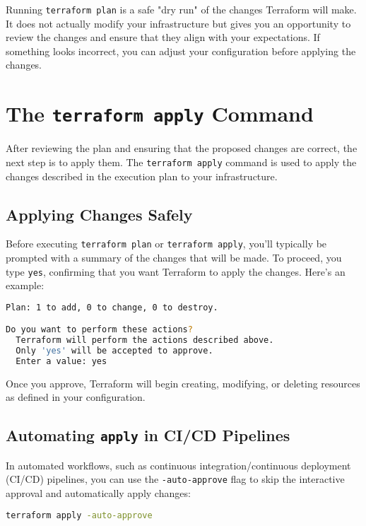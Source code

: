 Running \texttt{terraform plan} is a safe "dry run" of the changes Terraform will make. It does not actually modify your infrastructure but gives you an opportunity to review the changes and ensure that they align with your expectations. If something looks incorrect, you can adjust your configuration before applying the changes.

\section{The \texttt{terraform apply} Command}

After reviewing the plan and ensuring that the proposed changes are correct, the next step is to apply them. The \texttt{terraform apply} command is used to apply the changes described in the execution plan to your infrastructure.

\subsection{Applying Changes Safely}

Before executing \texttt{terraform plan} or \texttt{terraform apply}, you'll typically be prompted with a summary of the changes that will be made. To proceed, you type \texttt{yes}, confirming that you want Terraform to apply the changes. Here's an example:

\begin{lstlisting}[language=bash]
Plan: 1 to add, 0 to change, 0 to destroy.

Do you want to perform these actions?
  Terraform will perform the actions described above.
  Only 'yes' will be accepted to approve.
  Enter a value: yes
\end{lstlisting}

Once you approve, Terraform will begin creating, modifying, or deleting resources as defined in your configuration.

\subsection{Automating \texttt{apply} in CI/CD Pipelines}

In automated workflows, such as continuous integration/continuous deployment (CI/CD) pipelines, you can use the \texttt{-auto-approve} flag to skip the interactive approval and automatically apply changes:

\begin{lstlisting}[language=bash]
terraform apply -auto-approve
\end{lstlisting}

